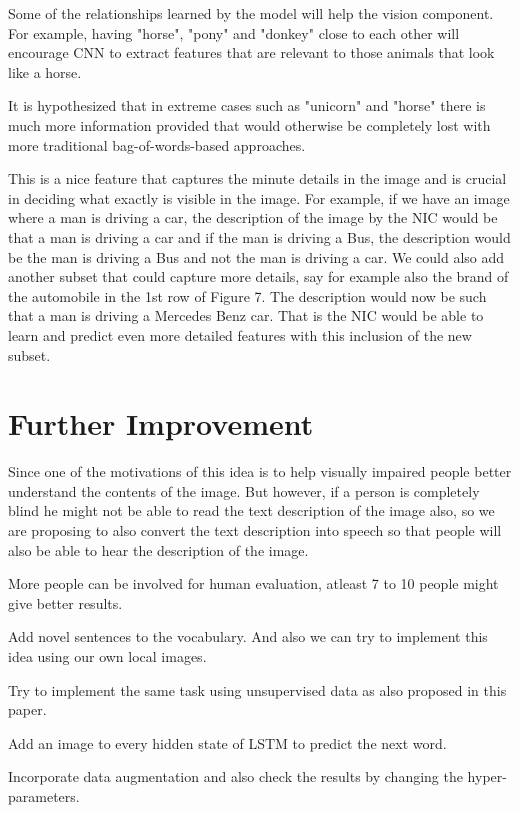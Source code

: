 \documentclass[a4paper,UKenglish,cleveref, autoref, thm-restate]{lipics-v2021}
\begin{document}
Some of the relationships learned by the model will help the vision component. For example, having "horse", "pony" and "donkey" close to each other will encourage CNN to extract features that are relevant to those animals that look like a horse.

It is hypothesized that in extreme cases such as "unicorn" and "horse" there is much more information provided that would otherwise be completely lost with more traditional bag-of-words-based approaches.

This is a nice feature that captures the minute details in the image and is crucial in deciding what exactly is visible in the image. For example, if we have an image where a man is driving a car, the description of the image by the NIC would be that a man is driving a car and if the man is driving a Bus, the description would be the man is driving a Bus and not the man is driving a car.
We could also add another subset that could capture more details, say for example also the brand of the automobile in the 1st row of Figure 7. The description would now be such that a man is driving a Mercedes Benz car. That is the NIC would be able to learn and predict even more detailed features with this inclusion of the new subset.

\label{results}


\section{Further Improvement}
\label{further improvement}
Since one of the motivations of this idea is to help visually impaired people better understand the contents of the image. But however, if a person is completely blind he might not be able to read the text description of the image also, so we are proposing to also convert the text description into speech so that people will also be able to hear the description of the image.

More people can be involved for human evaluation, atleast 7 to 10 people might give better results.

Add novel sentences to the vocabulary. And also we can try to implement this idea using our own local images.

Try to implement the same task using unsupervised data as also proposed in this paper.

Add an image to every hidden state of LSTM to predict the next word.

Incorporate data augmentation and also check the results by changing the hyper-parameters.
\end{document}
